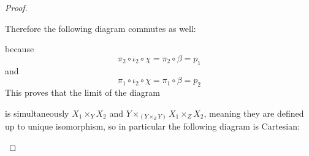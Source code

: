 \documentclass{article}
\begin{document}
\begin{proof}
\begin{center}
\end{center}
Therefore the following diagram commutes as well:
\begin{center}
    \end{center}
    because
    \[
    \pi_2\circ \iota_2\circ \chi=\pi_2\circ \beta=p_1
    \]
    and
    \[
    \pi_1\circ \iota_2\circ \chi=\pi_1\circ \beta=p_2
    \]
    This proves that the limit of the diagram
        \begin{center}
    \end{center}
    is simultaneously $X_1\times_Y X_2$ and $Y\times_{(Y\times_Z Y)} X_1\times_Z X_2$, meaning they are defined up to unique isomorphism, so in particular the following diagram is Cartesian:
    \begin{center}
    \end{center}
\end{proof}
\end{document}
